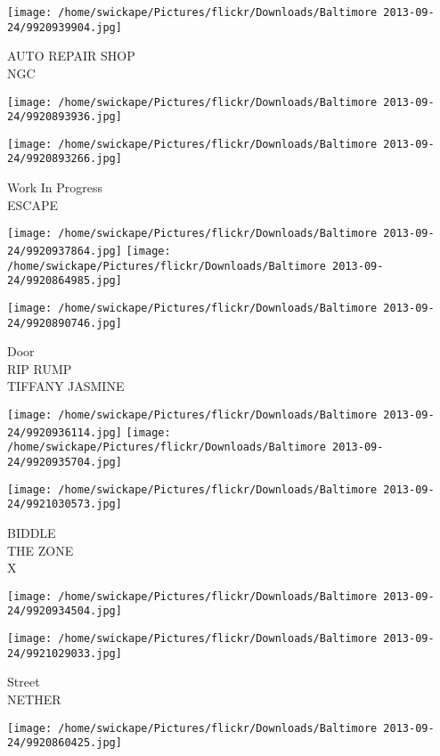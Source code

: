 \documentclass[10pt,letterpaper]{article}
\begin{document}
\vspace{0.25in}
\texttt{[image: /home/swickape/Pictures/flickr/Downloads/Baltimore 2013-09-24/9920939904.jpg]}

AUTO REPAIR SHOP\\
NGC
\pagebreak

\texttt{[image: /home/swickape/Pictures/flickr/Downloads/Baltimore 2013-09-24/9920893936.jpg]}

\vspace{0.25in}
\texttt{[image: /home/swickape/Pictures/flickr/Downloads/Baltimore 2013-09-24/9920893266.jpg]}

Work In Progress\\
ESCAPE
\pagebreak

\texttt{[image: /home/swickape/Pictures/flickr/Downloads/Baltimore 2013-09-24/9920937864.jpg]}
\texttt{[image: /home/swickape/Pictures/flickr/Downloads/Baltimore 2013-09-24/9920864985.jpg]}

\vspace{0.25in}
\texttt{[image: /home/swickape/Pictures/flickr/Downloads/Baltimore 2013-09-24/9920890746.jpg]}

Door\\
RIP RUMP\\
TIFFANY JASMINE
\pagebreak

\texttt{[image: /home/swickape/Pictures/flickr/Downloads/Baltimore 2013-09-24/9920936114.jpg]}
\texttt{[image: /home/swickape/Pictures/flickr/Downloads/Baltimore 2013-09-24/9920935704.jpg]}

\texttt{[image: /home/swickape/Pictures/flickr/Downloads/Baltimore 2013-09-24/9921030573.jpg]}

BIDDLE\\
THE ZONE\\
X
\pagebreak

\texttt{[image: /home/swickape/Pictures/flickr/Downloads/Baltimore 2013-09-24/9920934504.jpg]}

\vspace{0.25in}
\texttt{[image: /home/swickape/Pictures/flickr/Downloads/Baltimore 2013-09-24/9921029033.jpg]}

Street\\
NETHER
\pagebreak

\texttt{[image: /home/swickape/Pictures/flickr/Downloads/Baltimore 2013-09-24/9920860425.jpg]}
\end{document}
